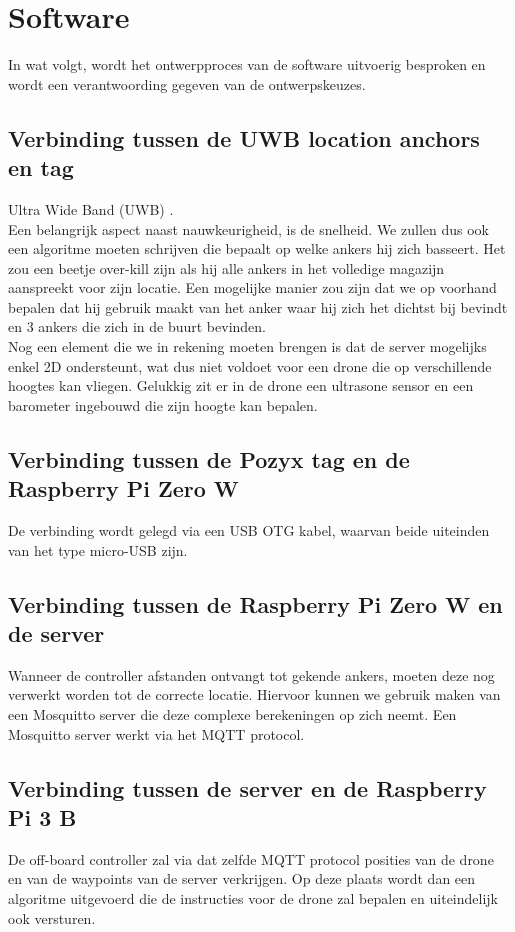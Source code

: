 \chapter{Software}
In wat volgt, wordt het ontwerpproces van de software uitvoerig besproken en wordt een verantwoording gegeven van de ontwerpskeuzes.

\section{Verbinding tussen de UWB location anchors en tag} \label{sec:uwb_tag}
Ultra Wide Band (UWB) \cite{uwb2016}.\\

Een belangrijk aspect naast nauwkeurigheid, is de snelheid. We zullen dus ook een algoritme moeten schrijven die bepaalt op welke ankers hij zich basseert. Het zou een beetje over-kill zijn als hij alle ankers in het volledige magazijn aanspreekt voor zijn locatie. Een mogelijke manier zou zijn dat we op voorhand bepalen dat hij gebruik maakt van het anker waar hij zich het dichtst bij bevindt en 3 ankers die zich in de buurt bevinden.\\

Nog een element die we in rekening moeten brengen is dat de server mogelijks enkel 2D ondersteunt, wat dus niet voldoet voor een drone die op verschillende hoogtes kan vliegen. Gelukkig zit er in de drone een ultrasone sensor en een barometer ingebouwd die zijn hoogte kan bepalen.

\section{Verbinding tussen de Pozyx tag en de Raspberry Pi Zero W} \label{sec:pozyx_raspberry}
De verbinding wordt gelegd via een USB OTG kabel, waarvan beide uiteinden van het type micro-USB zijn.

\section{Verbinding tussen de Raspberry Pi Zero W en de server} \label{sec:raspberry_server}
Wanneer de controller afstanden ontvangt tot gekende ankers, moeten deze nog verwerkt worden tot de correcte locatie. Hiervoor kunnen we gebruik maken van een Mosquitto server die deze complexe berekeningen op zich neemt. Een Mosquitto server werkt via het MQTT protocol.\\

\section{Verbinding tussen de server en de Raspberry Pi 3 B} \label{sec:server_raspberry}
De off-board controller zal via dat zelfde MQTT protocol posities van de drone en van de waypoints van de server verkrijgen. Op deze plaats wordt dan een algoritme uitgevoerd die de instructies voor de drone zal bepalen en uiteindelijk ook versturen.\\

